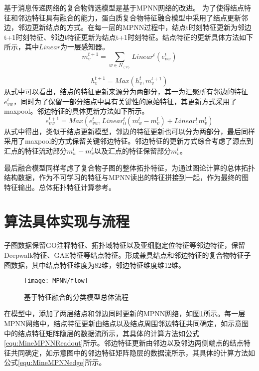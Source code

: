 基于消息传递网络的复合物筛选模型是基于MPNN网络的改进。
为了使得结点特征和邻边特征具有融合的能力，蛋白质复合物特征融合模型中采用了结点更新邻边，邻边更新结点的方式。在每一层的MPNN过程中，结点t时刻特征更新为邻边t+1时刻特征、邻边t特征更新为结点t+1时刻特征。结点特征的更新具体方法如下所示，其中$Linear$为一层感知器。
\begin{equation}
    \label{equ:MineMPNNPassing}
    m_v^{t+1} = \sum_{w \in N_{(v)}}Linear^t(e_{vw}^t)
\end{equation}

\begin{equation}
    \label{equ:MineMPNNReadout}
    h_v^{t+1} = Max(h_v^t,m_v^{t+1})
\end{equation}
从式中可以看出，结点的特征更新来源分为两部分，其一为汇聚所有邻边的特征$e_{vw}^t$，同时为了保留一部分结点中具有关键性的原始特征，其更新方式采用了maxpool。邻边特征的具体更新方法如下所示。
\begin{equation}
    \label{equ:MineMPNNedge}
    e_{vw}^{t+1} = Max(e_{vw}^t,Linear_0^t(m_w^{l} - m_v^{l}) + Linear_1^t m_v^{l})
\end{equation}
从式中得出，类似于结点更新模型，邻边的特征更新也可以分为两部分，最后同样采用了maxpool的方式保留关键邻边特征。邻边特征的更新方式综合考虑了源点到汇点的特征流动部分$m_w^{l} - m_v^{l}$以及汇点的特征保留部分$m_v^{l}$。


最后融合模型同样考虑了复合物子图的整体拓扑特征，为通过图论计算的总体拓扑结构数据，作为不可学习的特征与MPNN读出的特征拼接到一起，作为最终的图特征输出。总体拓扑特征计算参考\cite{yu_predicting_2014}。

\section{算法具体实现与流程}
\label{section:MPNN:flow}

子图数据保留GO注释特征、拓扑域特征以及亚细胞定位特征等邻边特征，保留Deepwalk特征、GAE特征等结点特征。形成兼具结点和邻边特征的复合物特征子图数据，其中结点特征维度为82维，邻边特征维度维12维。

\begin{figure}[htbp]
    \centering
    \texttt{[image: MPNN/flow]}
    \caption{基于特征融合的分类模型总体流程}
    \label{fig:MPNN/flow}
\end{figure}

在模型中，添加了两层结点和邻边同时更新的MPNN网络，如图\ref{fig:MPNN/flow}所示。每一层MPNN网络中，结点特征更新由结点以及结点周围邻边特征共同确定，如示意图中的结点特征矩阵隐层的数据流所示，其具体的计算方法如公式\ref{equ:MineMPNNReadout}所示。邻边特征更新由邻边以及邻边两侧端点的结点特征共同确定，如示意图中的邻边特征矩阵隐层的数据流所示，其具体的计算方法如公式\ref{equ:MineMPNNedge}所示。

